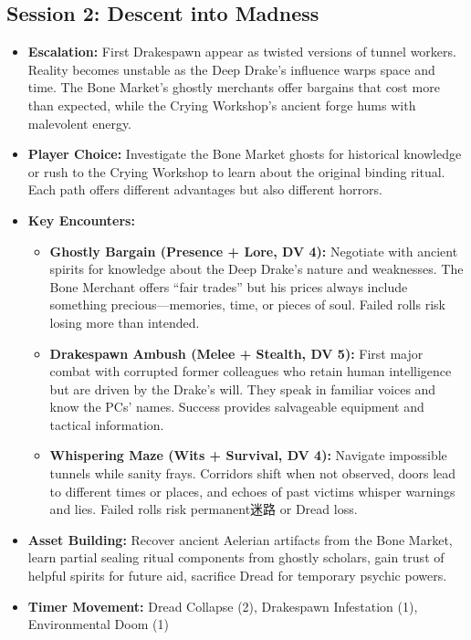 \documentclass[11pt]{article}
\begin{document}
\subsection{Session 2: Descent into Madness}
\begin{itemize}
\item \textbf{Escalation:} First Drakespawn appear as twisted versions of tunnel workers. Reality becomes unstable as the Deep Drake's influence warps space and time. The Bone Market's ghostly merchants offer bargains that cost more than expected, while the Crying Workshop's ancient forge hums with malevolent energy.
\item \textbf{Player Choice:} Investigate the Bone Market ghosts for historical knowledge or rush to the Crying Workshop to learn about the original binding ritual. Each path offers different advantages but also different horrors.
\item \textbf{Key Encounters:}
  \begin{itemize}
  \item \textbf{Ghostly Bargain (Presence + Lore, DV 4):} Negotiate with ancient spirits for knowledge about the Deep Drake's nature and weaknesses. The Bone Merchant offers ``fair trades'' but his prices always include something precious---memories, time, or pieces of soul. Failed rolls risk losing more than intended.
  \item \textbf{Drakespawn Ambush (Melee + Stealth, DV 5):} First major combat with corrupted former colleagues who retain human intelligence but are driven by the Drake's will. They speak in familiar voices and know the PCs' names. Success provides salvageable equipment and tactical information.
  \item \textbf{Whispering Maze (Wits + Survival, DV 4):} Navigate impossible tunnels while sanity frays. Corridors shift when not observed, doors lead to different times or places, and echoes of past victims whisper warnings and lies. Failed rolls risk permanent迷路 or Dread loss.
  \end{itemize}
\item \textbf{Asset Building:} Recover ancient Aelerian artifacts from the Bone Market, learn partial sealing ritual components from ghostly scholars, gain trust of helpful spirits for future aid, sacrifice Dread for temporary psychic powers.
\item \textbf{Timer Movement:} Dread Collapse (2), Drakespawn Infestation (1), Environmental Doom (1)
\end{itemize}
\end{document}
